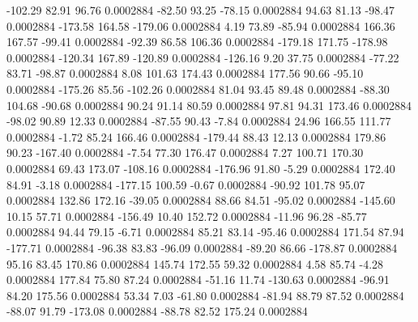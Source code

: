      -102.29       82.91       96.76     0.0002884
      -82.50       93.25      -78.15     0.0002884
       94.63       81.13      -98.47     0.0002884
     -173.58      164.58     -179.06     0.0002884
        4.19       73.89      -85.94     0.0002884
      166.36      167.57      -99.41     0.0002884
      -92.39       86.58      106.36     0.0002884
     -179.18      171.75     -178.98     0.0002884
     -120.34      167.89     -120.89     0.0002884
     -126.16        9.20       37.75     0.0002884
      -77.22       83.71      -98.87     0.0002884
        8.08      101.63      174.43     0.0002884
      177.56       90.66      -95.10     0.0002884
     -175.26       85.56     -102.26     0.0002884
       81.04       93.45       89.48     0.0002884
      -88.30      104.68      -90.68     0.0002884
       90.24       91.14       80.59     0.0002884
       97.81       94.31      173.46     0.0002884
      -98.02       90.89       12.33     0.0002884
      -87.55       90.43       -7.84     0.0002884
       24.96      166.55      111.77     0.0002884
       -1.72       85.24      166.46     0.0002884
     -179.44       88.43       12.13     0.0002884
      179.86       90.23     -167.40     0.0002884
       -7.54       77.30      176.47     0.0002884
        7.27      100.71      170.30     0.0002884
       69.43      173.07     -108.16     0.0002884
     -176.96       91.80       -5.29     0.0002884
      172.40       84.91       -3.18     0.0002884
     -177.15      100.59       -0.67     0.0002884
      -90.92      101.78       95.07     0.0002884
      132.86      172.16      -39.05     0.0002884
       88.66       84.51      -95.02     0.0002884
     -145.60       10.15       57.71     0.0002884
     -156.49       10.40      152.72     0.0002884
      -11.96       96.28      -85.77     0.0002884
       94.44       79.15       -6.71     0.0002884
       85.21       83.14      -95.46     0.0002884
      171.54       87.94     -177.71     0.0002884
      -96.38       83.83      -96.09     0.0002884
      -89.20       86.66     -178.87     0.0002884
       95.16       83.45      170.86     0.0002884
      145.74      172.55       59.32     0.0002884
        4.58       85.74       -4.28     0.0002884
      177.84       75.80       87.24     0.0002884
      -51.16       11.74     -130.63     0.0002884
      -96.91       84.20      175.56     0.0002884
       53.34        7.03      -61.80     0.0002884
      -81.94       88.79       87.52     0.0002884
      -88.07       91.79     -173.08     0.0002884
      -88.78       82.52      175.24     0.0002884

